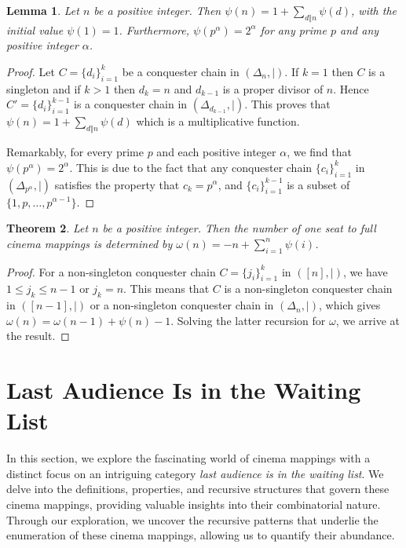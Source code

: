 \documentclass{amsart}
\newtheorem{theorem}{Theorem}[section]
\newtheorem{lemma}[theorem]{Lemma}
\theoremstyle{definition}
\begin{document}
\begin{lemma}
Let $n$ be a positive integer. Then $\psi(n) =1+ \sum_{d\Vert n} \psi(d)$, with the initial value $\psi(1)=1$. Furthermore, $\psi(p^\alpha)=2^\alpha$ for any prime $p$ and any positive integer $\alpha$.
\end{lemma}

\begin{proof}
Let $C=\{d_i\}_{i=1}^k$ be a conquester chain in $(\Delta_n,|)$. If $k=1$ then $C$ is a singleton and if $k>1$ then $d_k=n$ and $d_{k-1}$ is a proper divisor of $n$. Hence $C'=\{d_i\}_{i=1}^{k-1}$ is a conquester chain in $(\Delta_{d_{k-1}},|)$. This proves that $\psi(n)= 1+ \sum_{d\Vert n} \psi(d)$ which is a multiplicative function. 

Remarkably, for every prime $p$ and each positive integer $\alpha$, we find that $\psi(p^\alpha) = 2^\alpha$. This is due to the fact that any conquester chain $\{c_i\}_{i=1}^k$ in $(\Delta_{p^\alpha},|)$ satisfies the property that $c_k=p^\alpha$, and $\{c_i\}_{i=1}^{k-1}$ is a subset of $\{1,p,\ldots,p^{\alpha-1}\}$. 
\end{proof}

\begin{theorem}
Let $n$ be a positive integer. Then the number of one seat to full cinema mappings is determined by $\omega(n)=-n+\sum_{i=1}^n\psi(i)$.
\end{theorem}

\begin{proof}
For a non-singleton conquester chain $C=\{j_i\}_{i=1}^k$ in $([n],|)$, we have $1\leqslant j_k\leqslant n-1$ or $j_k=n$. This means that $C$ is a non-singleton conquester chain in $([n-1],|)$ or a non-singleton conquester chain in $(\Delta_n,|)$, which gives $\omega(n)=\omega(n-1)+\psi(n)-1$. Solving the latter recursion for $\omega$, we arrive at the result.
\end{proof}

\section{Last Audience Is in the Waiting List}

In this section, we explore the fascinating world of cinema mappings with a distinct focus on an intriguing category \textit{last audience is in the waiting list}. We delve into the definitions, properties, and recursive structures that govern these cinema mappings, providing valuable insights into their combinatorial nature. Through our exploration, we uncover the recursive patterns that underlie the enumeration of these cinema mappings, allowing us to quantify their abundance.
\end{document}
